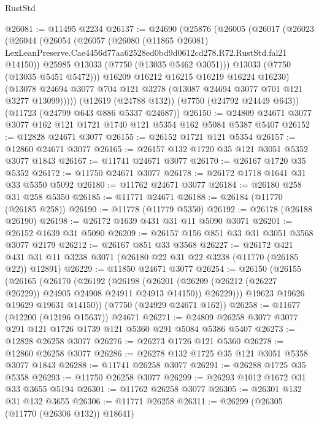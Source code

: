 \begin{lexlean}{RustStd}
\begin{coremodule}
@26081 := @11495 @2234
@26137 := @24690
    (@25876
      (@26005
        (@26017
          (@26023
            (@26044
              (@26054
                (@26057
                  (@26080
                    (@11865 @26081)
                    LexLeanPreserve.Cae4456d77aa62528ed0bd9d0612cd278.R72.RustStd.fal21
                    @14150))
                @25985
                @13033
                (@7750 (@13035 @5462 @3051)))
              @13033
              (@7750 (@13035 @5451 @5472)))
            @16209
            @16212
            @16215
            @16219
            @16224
            @16230)
          (@13078 @24694 @3077 @704 @121 @3278 (@13087 @24694 @3077 @701 @121 @3277 @13099)))))
    (@12619 (@24788 @132))
    (@7750 (@24792 @24449 @643))
    (@11723 (@24799 @643 @886 @5337 @24687))
@26150 := @24809 @24671 @3077 @3077 @162 @121 @1721 @1740 @121 @5354 @162 @5084 @5387 @5407
@26152 := @12828 @24671 @3077
@26155 := @26152 @1721 @121 @5354
@26157 := @12860 @24671 @3077
@26165 := @26157 @132 @1720 @35 @121 @3051 @5352 @3077 @1843
@26167 := @11741 @24671 @3077
@26170 := @26167 @1720 @35 @5352
@26172 := @11750 @24671 @3077
@26178 := @26172 @1718 @1641 @31 @33 @5350 @5092
@26180 := @11762 @24671 @3077
@26184 := @26180 @258 @31 @258 @5350
@26185 := @11771 @24671
@26188 := @26184 (@11770 (@26185 @258))
@26190 := @11778 (@11779 @5350)
@26192 := @26178 (@26188 @26190)
@26198 := @26172 @1639 @431 @31 @11 @5090 @3071
@26201 := @26152 @1639 @31 @5090
@26209 := @26157 @156 @851 @33 @31 @3051 @3568 @3077 @2179
@26212 := @26167 @851 @33 @3568
@26227 := @26172
    @421
    @431
    @31
    @11
    @3238
    @3071
    (@26180 @22 @31 @22 @3238 (@11770 (@26185 @22)) @12891)
@26229 := @11850 @24671 @3077
@26254 := @26150
    (@26155
      (@26165
        (@26170
          (@26192
            (@26198
              (@26201 (@26209 (@26212 (@26227 @26229)) @24905 @24908 @24911 @24913 @14150))
              @26229)))
        @19623
        @19626
        @19629
        @19631
        @14150))
    (@7750 (@24929 @24671 @162))
@26258 := @11677 (@12200 (@12196 @15637)) @24671
@26271 := @24809 @26258 @3077 @3077 @291 @121 @1726 @1739 @121 @5360 @291 @5084 @5386 @5407
@26273 := @12828 @26258 @3077
@26276 := @26273 @1726 @121 @5360
@26278 := @12860 @26258 @3077
@26286 := @26278 @132 @1725 @35 @121 @3051 @5358 @3077 @1843
@26288 := @11741 @26258 @3077
@26291 := @26288 @1725 @35 @5358
@26293 := @11750 @26258 @3077
@26299 := @26293 @1012 @1672 @31 @33 @3655 @5194
@26301 := @11762 @26258 @3077
@26305 := @26301 @132 @31 @132 @3655
@26306 := @11771 @26258
@26311 := @26299 (@26305 (@11770 (@26306 @132)) @18641)

\end{coremodule}
\end{lexlean}
